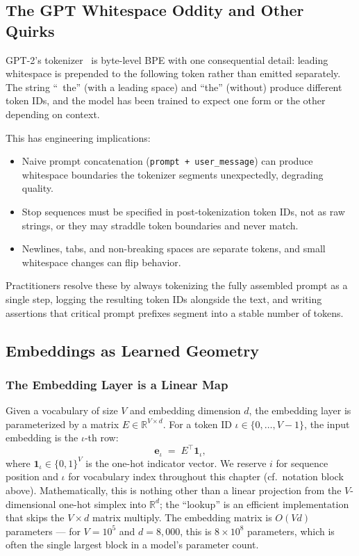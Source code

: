 \subsection{The GPT Whitespace Oddity and Other Quirks}

GPT-2's tokenizer~\citep{radford2019language,openai_tiktoken} is
byte-level BPE with one consequential detail: leading whitespace is
prepended to the following token rather than emitted separately. The
string ``\ the'' (with a leading space) and ``the'' (without) produce
different token IDs, and the model has been trained to expect one
form or the other depending on context.

This has engineering implications:
\begin{itemize}
  \item Naive prompt concatenation
        (\texttt{prompt + user\_message}) can produce whitespace
        boundaries the tokenizer segments unexpectedly, degrading
        quality.
  \item Stop sequences must be specified in post-tokenization token
        IDs, not as raw strings, or they may straddle token boundaries
        and never match.
  \item Newlines, tabs, and non-breaking spaces are separate tokens,
        and small whitespace changes can flip behavior.
\end{itemize}
Practitioners resolve these by always tokenizing the fully assembled
prompt as a single step, logging the resulting token IDs alongside the
text, and writing assertions that critical prompt prefixes segment
into a stable number of tokens.

\subsection{Embeddings as Learned Geometry}

\subsubsection{The Embedding Layer is a Linear Map}

Given a vocabulary of size $V$ and embedding dimension $d$, the
embedding layer is parameterized by a matrix $E \in \mathbb{R}^{V \times d}$.
For a token ID $\iota \in \{0,\dots,V-1\}$, the input embedding is
the $\iota$-th row:
\begin{equation}
\label{eq:week3-embed}
\mathbf{e}_\iota \;=\; E^{\top} \mathbf{1}_\iota,
\end{equation}
where $\mathbf{1}_\iota \in \{0,1\}^{V}$ is the one-hot indicator vector.
We reserve $i$ for sequence position and $\iota$ for vocabulary
index throughout this chapter (cf.\ notation block above).
Mathematically, this is nothing other than a linear projection from
the $V$-dimensional one-hot simplex into $\mathbb{R}^{d}$; the
``lookup'' is an efficient implementation that skips the $V \times d$
matrix multiply. The embedding matrix is $O(Vd)$ parameters — for
$V = 10^5$ and $d = 8{,}000$, this is $8\times 10^8$ parameters, which
is often the single largest block in a model's parameter count.

